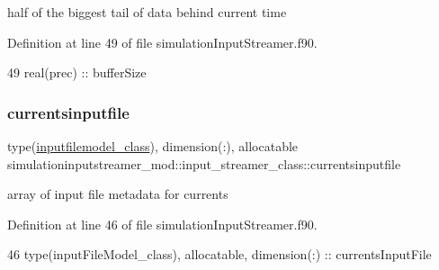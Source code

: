 half of the biggest tail of data behind current time 



Definition at line 49 of file simulation\+Input\+Streamer.\+f90.


\begin{DoxyCode}
49         \textcolor{keywordtype}{real(prec)} :: bufferSize
\end{DoxyCode}
\mbox{\label{structsimulationinputstreamer__mod_1_1input__streamer__class_aa12635920288984ada44e425ea05bf10}} 
\subsubsection{\texorpdfstring{currentsinputfile}{currentsinputfile}}
{\footnotesize\ttfamily type(\mbox{\hyperlink{structsimulationinputstreamer__mod_1_1inputfilemodel__class}{inputfilemodel\+\_\+class}}), dimension(\+:), allocatable simulationinputstreamer\+\_\+mod\+::input\+\_\+streamer\+\_\+class\+::currentsinputfile\hspace{0.3cm}{\ttfamily [private]}}



array of input file metadata for currents 



Definition at line 46 of file simulation\+Input\+Streamer.\+f90.


\begin{DoxyCode}
46         \textcolor{keywordtype}{type}(inputFileModel\_class), \textcolor{keywordtype}{allocatable}, \textcolor{keywordtype}{dimension(:)} :: currentsInputFile
\end{DoxyCode}
\mbox{\label{structsimulationinputstreamer__mod_1_1input__streamer__class_a827d38efa4fcc80677907577c173eb14}} 

